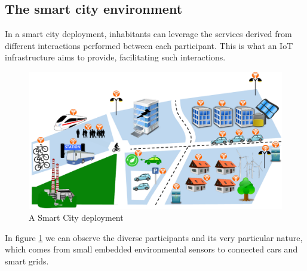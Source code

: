 \subsection{The smart city environment}
\label{sec:SmartCityEnv}
In a smart city deployment\cite{smartsantander}, inhabitants can leverage the services derived from different interactions performed between each participant.
This is what an IoT infrastructure aims to provide, facilitating such interactions.

\begin{figure}[htb]
	\centering
	\includegraphics[width=1\columnwidth]{chapters/background.images/SmartCity_comm.pdf}
	\caption{A Smart City deployment}
	\label{fig:SmartCity}
\end{figure}

In figure \ref{fig:SmartCity} we can observe the diverse participants and its very particular nature, which comes from small embedded environmental sensors to connected cars and smart grids.

